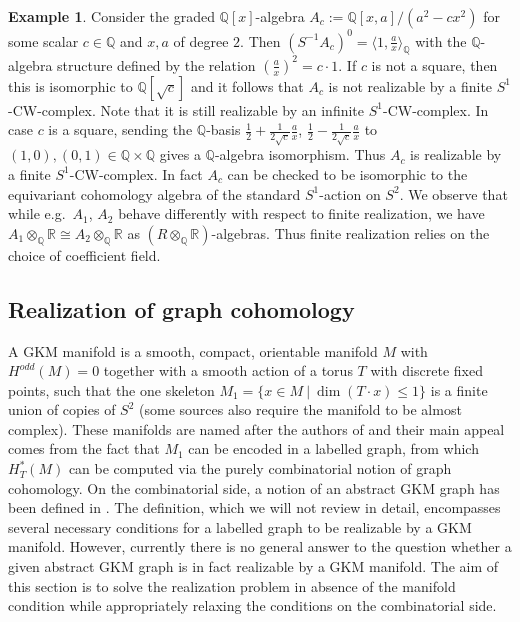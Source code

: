 \documentclass[12pt,a4paper]{article}
\theoremstyle{definition}
\newtheorem{ex}[thm]{Example}
\begin{document}
\begin{ex}\label{ex:nonrealizable}
Consider the graded $\mathbb{Q}[x]$-algebra $A_c:=\mathbb{Q}[x,a]/(a^2-cx^2)$ for some scalar $c\in \mathbb{Q}$ and $x,a$ of degree $2$. Then $(S^{-1}A_c)^0=\langle 1, \frac{a}{x}\rangle_\mathbb{Q}$ with the $\mathbb{Q}$-algebra structure defined by the relation $\left(\frac{a}{x}\right)^2=c\cdot 1$. If $c$ is not a square, then this is isomorphic to $\mathbb{Q}[\sqrt{c}]$ and it follows that $A_c$ is not realizable by a finite $S^1$-CW-complex. Note that it is still realizable by an infinite $S^1$-CW-complex. In case $c$ is a square, sending the $\mathbb{Q}$-basis $\frac{1}{2}+\frac{1}{2\sqrt{c}}\frac{a}{x}$, $\frac{1}{2}-\frac{1}{2\sqrt{c}}\frac{a}{x}$ to $(1,0),(0,1)\in\mathbb{Q}\times\mathbb{Q}$ gives a $\mathbb{Q}$-algebra isomorphism. Thus $A_c$ is realizable by a finite $S^1$-CW-complex. In fact $A_c$ can be checked to be isomorphic to the equivariant cohomology algebra of the standard $S^1$-action on $S^2$. We observe that while e.g.\ $A_1$, $A_2$ behave differently with respect to finite realization, we have $A_1\otimes_\mathbb{Q}\mathbb{R}\cong A_2\otimes_\mathbb{Q}\mathbb{R}$ as $(R\otimes_\mathbb{Q}\mathbb{R})$-algebras. Thus finite realization relies on the choice of coefficient field. 
\end{ex}


\subsection{Realization of graph cohomology} \label{sec:GKM}
A GKM manifold is a smooth, compact, orientable manifold $M$ with $H^{odd}(M)=0$ together with a smooth action of a torus $T$ with discrete fixed points, such that the one skeleton $M_1=\{x\in M~|~ \dim (T\cdot x)\leq 1\}$ is a finite union of copies of $S^2$ (some sources also require the manifold to be almost complex). These manifolds are named after the authors of \cite{GKM} and their main appeal comes from the fact that $M_1$ can be encoded in a labelled graph, from which $H_T^*(M)$ can be computed via the purely combinatorial notion of graph cohomology. On the combinatorial side, a notion of an abstract GKM graph has been defined in \cite{GuilleminZara}. The definition, which we will not review in detail, encompasses several necessary conditions for a labelled graph to be realizable by a GKM manifold. However, currently there is no general answer to the question whether a given abstract GKM graph is in fact realizable by a GKM manifold. The aim of this section is to solve the realization problem in absence of the manifold condition while appropriately relaxing the conditions on the combinatorial side.
\end{document}
